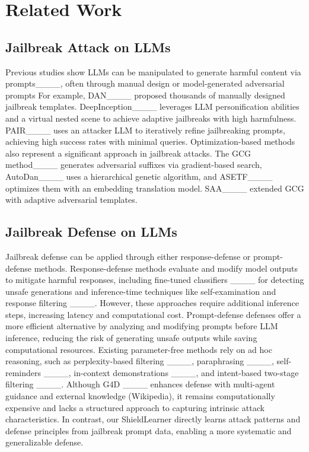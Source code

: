 \section{Related Work}
\label{Related Work}
\subsection{Jailbreak Attack on LLMs}
Previous studies show LLMs can be manipulated to generate harmful content via prompts____, often through manual design or model-generated adversarial prompts
For example, DAN____ proposed thousands of manually designed jailbreak templates. DeepInception____ leverages LLM personification abilities and a virtual nested scene to achieve adaptive jailbreaks with high harmfulness. PAIR____ uses an attacker LLM to iteratively refine jailbreaking prompts, achieving high success rates with minimal queries.
Optimization-based methods also represent a significant approach in jailbreak attacks. 
The GCG method____ generates adversarial suffixes via gradient-based search, AutoDan____ uses a hierarchical genetic algorithm, and ASETF____ optimizes them with an embedding translation model.
SAA____ extended GCG with adaptive adversarial templates. 

\subsection{Jailbreak Defense on LLMs}
Jailbreak defense can be applied through either response-defense or prompt-defense methods.
Response-defense methods evaluate and modify model outputs to mitigate harmful responses, including fine-tuned classifiers ____ for detecting unsafe generations and inference-time techniques like self-examination and response filtering ____.
However, these approaches require additional inference steps, increasing latency and computational cost.
Prompt-defense defenses offer a more efficient alternative by analyzing and modifying prompts before LLM inference, reducing the risk of generating unsafe outputs while saving computational resources. 
Existing parameter-free methods rely on ad hoc reasoning, such as perplexity-based filtering ____, paraphrasing ____, self-reminders ____, in-context demonstrations ____, and intent-based two-stage filtering ____. Although G4D ____ enhances defense with multi-agent guidance and external knowledge (Wikipedia), it remains computationally expensive and lacks a structured approach to capturing intrinsic attack characteristics. In contrast, our ShieldLearner directly learns attack patterns and defense principles from jailbreak prompt data, enabling a more systematic and generalizable defense.